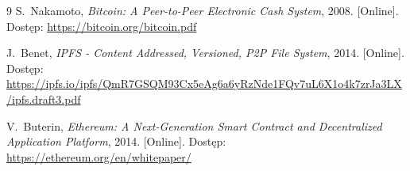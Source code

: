 \documentclass[12pt,a4paper,twoside]{report}
\begin{document}
\begin{thebibliography}{9}
S.~Nakamoto, \textit{Bitcoin: A Peer-to-Peer Electronic Cash System}, 2008. [Online]. Dostęp: \url{https://bitcoin.org/bitcoin.pdf}

J.~Benet, \textit{IPFS - Content Addressed, Versioned, P2P File System}, 2014. [Online]. Dostęp: \url{https://ipfs.io/ipfs/QmR7GSQM93Cx5eAg6a6yRzNde1FQv7uL6X1o4k7zrJa3LX/ipfs.draft3.pdf}

V.~Buterin, \textit{Ethereum: A Next-Generation Smart Contract and Decentralized Application Platform}, 2014. [Online]. Dostęp: \url{https://ethereum.org/en/whitepaper/}
\end{thebibliography}
\end{document}
